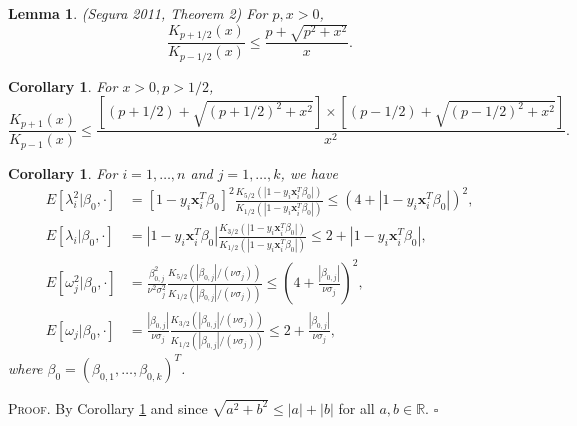 \documentclass[12pt]{article}
\newtheorem{lemma}[theorem]{Lemma}
\newtheorem{corollary}[theorem]{Corollary}
\newcounter{ProofCounter}
\newenvironment{Proof}{\stepcounter{ProofCounter}\textsc{Proof.}}{\hfill$\square$}
\begin{document}
\begin{lemma}
  (Segura 2011, Theorem 2)
  For $p, x > 0$, 
  \[
    \frac{K_{p+1/2}(x)}{K_{p-1/2}(x)} \leq \frac{p + \sqrt{p^2 + x^2}}{x}.
  \]
  \label{l4}
\end{lemma} 

\begin{corollary}
  For $x > 0, p > 1/2$,
  \[
    \frac{K_{p+1}(x)}{K_{p-1}(x)} \leq \frac{\left[(p+1/2) + \sqrt{(p+1/2)^2 + x^2}\right]\times\left[(p-1/2) + \sqrt{(p-1/2)^2 + x^2}\right]}{x^2}.
  \]
  \label{c1}
\end{corollary}

\begin{corollary}
  For $i = 1,\dots, n$ and $j = 1,\dots,k$, we have
  \begin{align*}
    E[\lambda_i^2|\beta_0, \cdot] & = [1 - y_i\bm{x}_i^T\beta_0]^2 \frac{K_{5/2}\left( |1 - y_i\bm{x}_i^T\beta_0| \right)}{K_{1/2}\left( |1 - y_i\bm{x}_i^T\beta_0|
    \right)} \leq \left( 4 + |1 - y_i \bm{x}_i^T \beta_0| \right)^2, \\
    E[\lambda_i|\beta_0, \cdot] & = |1 - y_i\bm{x}_i^T\beta_0| \frac{K_{3/2}\left( |1 - y_i\bm{x}_i^T\beta_0| \right)}{K_{1/2}\left( |1 - y_i\bm{x}_i^T\beta_0|
    \right)} \leq 2 + |1-y_i\bm{x}_i^T\beta_0|,  \\
    E[\omega_j^2|\beta_0, \cdot] & = \frac{\beta_{0,j}^2}{\nu^2 \sigma_j^2} \frac{K_{5/2}\left( |\beta_{0,j}| / (\nu\sigma_j) \right)}{ 
    K_{1/2}\left( |\beta_{0,j}| / (\nu \sigma_{j}) \right)} \leq \left( 4 + \frac{|\beta_{0,j}|}{\nu \sigma_j} \right)^2, \\
    E[\omega_j|\beta_0, \cdot] & = \frac{|\beta_{0,j}|}{\nu\sigma_j} \frac{K_{3/2}\left( |\beta_{0,j}| / (\nu\sigma_j) \right)}{ 
    K_{1/2}\left( |\beta_{0,j}| / (\nu \sigma_{j}) \right)} \leq 2 + \frac{|\beta_{0,j}|}{\nu \sigma_j},
  \end{align*}
  where $\beta_0 = (\beta_{0,1}, \dots, \beta_{0,k})^T$.
  \label{c2}
\end{corollary}
\begin{Proof}
  By Corollary \ref{c1} and since $\sqrt{a^2 + b^2} \leq |a| + |b|$ for all $a,b \in \mathbb{R}$.
\end{Proof} \\
\end{document}
